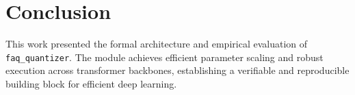 \section{Conclusion}
This work presented the formal architecture and empirical evaluation of \texttt{faq_quantizer}. The module achieves efficient parameter scaling and robust execution across transformer backbones, establishing a verifiable and reproducible building block for efficient deep learning.
